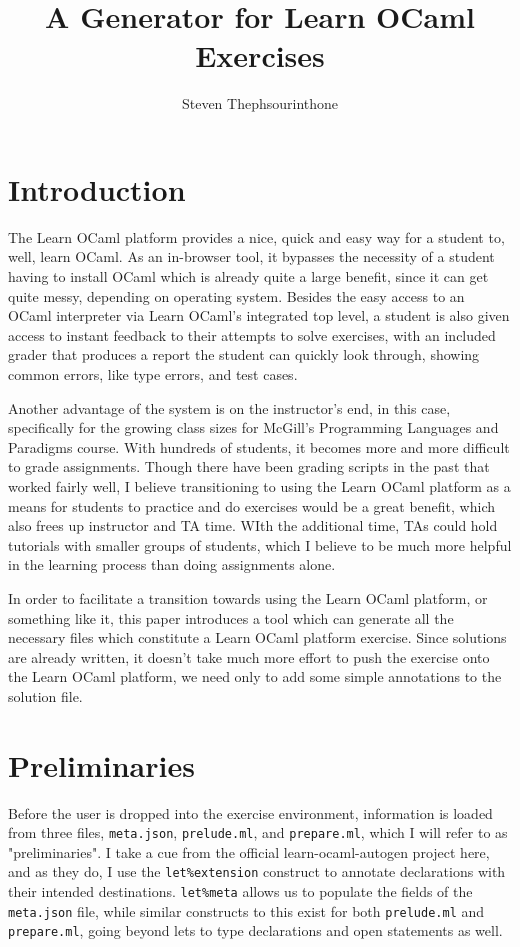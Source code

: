 \documentclass[11pt]{article} %
\title{A Generator for Learn OCaml Exercises}
\author{Steven Thephsourinthone}
\begin{document}
\maketitle

\section{Introduction}
The Learn OCaml platform provides a nice, quick and easy way for a student to, well, learn OCaml. As an in-browser tool, it bypasses the necessity of a student having to install OCaml which is already quite a large benefit, since it can get quite messy, depending on operating system. Besides the easy access to an OCaml interpreter via Learn OCaml's integrated top level, a student is also given access to instant feedback to their attempts to solve exercises, with an included grader that produces a report the student can quickly look through, showing common errors, like type errors, and test cases.

Another advantage of the system is on the instructor's end, in this case, specifically for the growing class sizes for McGill's Programming Languages and Paradigms course. With hundreds of students, it becomes more and more difficult to grade assignments. Though there have been grading scripts in the past that worked fairly well, I believe transitioning to using the Learn OCaml platform as a means for students to practice and do exercises would be a great benefit, which also frees up instructor and TA time. WIth the additional time, TAs could hold tutorials with smaller groups of students, which I believe to be much more helpful in the learning process than doing assignments alone.

In order to facilitate a transition towards using the Learn OCaml platform, or something like it, this paper introduces a tool which can generate all the necessary files which constitute a Learn OCaml platform exercise. Since solutions are already written, it doesn't take much more effort to push the exercise onto the Learn OCaml platform, we need only to add some simple annotations to the solution file.

\section{Preliminaries}
Before the user is dropped into the exercise environment, information is loaded from three files, \verb+meta.json+, \verb+prelude.ml+, and \verb+prepare.ml+, which I will refer to as "preliminaries". I take a cue from the official learn-ocaml-autogen project here, and as they do, I use the \verb+let%extension+ construct to annotate declarations with their intended destinations. \verb+let%meta+ allows us to populate the fields of the \verb+meta.json+ file, while similar constructs to this exist for both \verb+prelude.ml+ and \verb+prepare.ml+, going beyond lets to type declarations and open statements as well.
\end{document}
